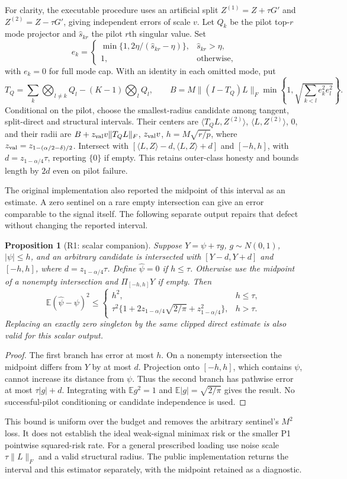 \documentclass[11pt]{article}
\newtheorem{proposition}{Proposition}
\newcommand{\E}{\mathbb E}
\newcommand{\ip}[2]{\langle #1,#2\rangle}
\newcommand{\norm}[1]{\lVert #1\rVert}
\begin{document}
For clarity, the executable procedure uses an artificial split
$Z^{(1)}=Z+\tau G'$ and $Z^{(2)}=Z-\tau G'$, giving independent errors of scale $v$. Let $Q_k$ be the pilot top-$r$ mode projector and $\widehat s_{kr}$ the pilot $r$th singular value. Set
\[
 e_k=\begin{cases}\min\{1,2\eta/(\widehat s_{kr}-\eta)\},&\widehat s_{kr}>\eta,\\1,&\text{otherwise},\end{cases}
\]
with $e_k=0$ for full mode cap. With an identity in each omitted mode, put
\[
 T_Q=\sum_k\bigotimes_{l\ne k}Q_l-(K-1)\bigotimes_lQ_l,
 \qquad B=M\norm{(I-T_Q)L}_F\min\left\{1,\sqrt{\sum_{k<l}e_k^2e_l^2}\right\}.
\]
Conditional on the pilot, choose the smallest-radius candidate among tangent, split-direct and structural intervals. Their centers are $\ip{T_QL}{Z^{(2)}}$, $\ip L{Z^{(2)}}$, $0$, and their radii are $B+z_{\rm val}v\norm{T_QL}_F$, $z_{\rm val}v$, $h=M\sqrt{r/p}$, where $z_{\rm val}=z_{1-(\alpha/2-\delta)/2}$. Intersect with $[\ip LZ-d,\ip LZ+d]$ and $[-h,h]$, with $d=z_{1-\alpha/4}\tau$, reporting $\{0\}$ if empty. This retains outer-class honesty and bounds length by $2d$ even on pilot failure.

The original implementation also reported the midpoint of this interval as an estimate. A zero sentinel on a rare empty intersection can give an error comparable to the signal itself. The following separate output repairs that defect without changing the reported interval.
\begin{proposition}[R1: scalar companion]\label{prop:companion}
Suppose $Y=\psi+\tau g$, $g\sim N(0,1)$, $|\psi|\le h$, and an arbitrary candidate is intersected with $[Y-d,Y+d]$ and $[-h,h]$, where $d=z_{1-\alpha/4}\tau$. Define $\widehat\psi=0$ if $h\le\tau$. Otherwise use the midpoint of a nonempty intersection and $\Pi_{[-h,h]}Y$ if empty. Then
\[
 \E(\widehat\psi-\psi)^2\le
 \begin{cases}h^2,&h\le\tau,\\
 \tau^2\{1+2z_{1-\alpha/4}\sqrt{2/\pi}+z_{1-\alpha/4}^2\},&h>\tau.
 \end{cases}
\]
Replacing an exactly zero singleton by the same clipped direct estimate is also valid for this scalar output.
\end{proposition}
\begin{proof}
The first branch has error at most $h$. On a nonempty intersection the midpoint differs from $Y$ by at most $d$. Projection onto $[-h,h]$, which contains $\psi$, cannot increase its distance from $\psi$. Thus the second branch has pathwise error at most $\tau|g|+d$. Integrating with $\E g^2=1$ and $\E|g|=\sqrt{2/\pi}$ gives the result. No successful-pilot conditioning or candidate independence is used.
\end{proof}
This bound is uniform over the budget and removes the arbitrary sentinel's $M^2$ loss. It does not establish the ideal weak-signal minimax risk or the smaller P1 pointwise squared-risk rate. For a general prescribed loading use noise scale $\tau\norm L_F$ and a valid structural radius. The public implementation returns the interval and this estimator separately, with the midpoint retained as a diagnostic.
\end{document}
